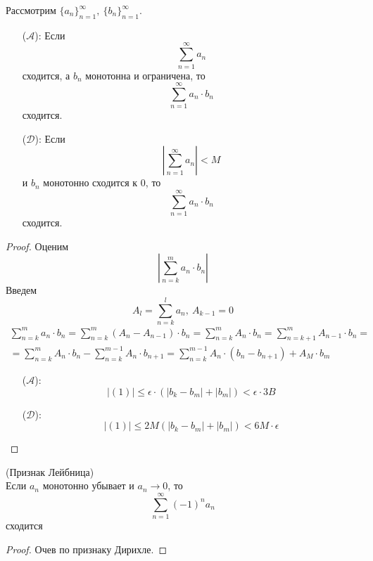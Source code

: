 \begin{theorem}
    Рассмотрим $\{a_n\}_{n=1}^{\infty},\ \{b_n\}_{n=1}^{\infty}$.
    \begin{itemize}
        \item[($\mathcal{A}$):] Если 
        \[\sum_{n=1}^{\infty}a_n\]
        сходится, а $b_n$ монотонна и ограничена, то
        \[\sum_{n=1}^{\infty}a_n\cdot b_n\]
        сходится.
        \item[($\mathcal{D}$):] Если
        \[\left|\sum_{n=1}^{\infty}a_n\right|<M\]
        и $b_n$ монотонно сходится к 0, то
        \[\sum_{n=1}^{\infty}a_n\cdot b_n\]
        сходится. 
    \end{itemize}
\end{theorem}
\begin{proof}
    Оценим 
    \[\left|\sum_{n=k}^{m}a_n\cdot b_n\right|\]
    Введем
    \[A_l=\sum_{n=k}^{l}a_n,\ A_{k-1}=0\]
    \begin{multline}
        \sum_{n=k}^{m}a_n\cdot b_n=\sum_{n=k}^{m}(A_n-A_{n-1})\cdot b_n=\sum_{n=k}^{m}A_n\cdot b_n=\sum_{n=k+1}^{m}A_{n-1}\cdot b_n=\\
        =\sum_{n=k}^{m}A_n\cdot b_n-\sum_{n=k}^{m-1}A_n\cdot b_{n+1}=\sum_{n=k}^{m-1}A_n\cdot(b_n-b_{n+1})+A_M\cdot b_m
    \end{multline}
    \begin{itemize}
        \item[($\mathcal{A}$):] 
        \[|(1)|\leq \epsilon\cdot (|b_k-b_m|+|b_m|)<\epsilon\cdot 3B\] %
        \item[($\mathcal{D}$):]
        \[|(1)|\leq 2M(|b_k-b_m|+|b_m|)<6M\cdot \epsilon\]
    \end{itemize}
\end{proof}
\begin{consequense} (Признак Лейбница)\\
    Если $a_n$ монотонно убывает и $a_n\to 0$, то 
    \[\sum_{n=1}^{\infty}(-1)^n a_n\]
    сходится
\end{consequense}
\begin{proof}
    Очев по признаку Дирихле.
\end{proof}

